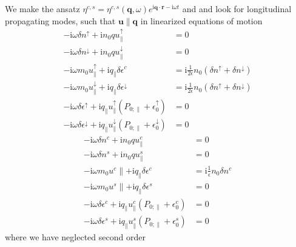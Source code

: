 \documentclass[aps,prb,reprint,twocolumns,superscriptaddress,nofootinbib]{revtex4-2}
\newcommand{\ii}{\mathrm{i}}
\begin{document}
We make the ansatz $ \eta^{c,s}=\eta^{c,s}(\bm q,\omega)e^{\ii\bm q\cdot \bm r-\ii\omega t}$ and and look for longitudinal propagating modes, such that $\bm u\parallel \bm q$ in linearized equations of motion
\begin{align}
	-\ii\omega \delta n^\uparrow + \ii n_0 q u_\parallel^\uparrow &=0 \\
	-\ii\omega \delta n^\downarrow + \ii n_0 q u_\parallel^\downarrow &=0 \\
	-\ii\omega m_0 u^\uparrow_\parallel + \ii q_\parallel \delta \epsilon^c &= \ii \frac{1}{2\epsilon} n_0(\delta n^\uparrow + \delta n^\downarrow) \\ 
	-\ii\omega m_0 u^\downarrow_\parallel + \ii q_\parallel \delta \epsilon^\downarrow &= \ii \frac{1}{2\epsilon} n_0(\delta n^\uparrow + \delta n^\downarrow) \\ 
	-\ii\omega \delta\epsilon^\uparrow + \ii q_\parallel u_\parallel^\uparrow\left(
	P_{0;\parallel} + \epsilon_0^\uparrow  \right) &=0 \\ 
	-\ii\omega \delta\epsilon^\downarrow + \ii q_\parallel u_\parallel^\downarrow\left(
	P_{0;\parallel} + \epsilon_0^\downarrow  \right) &=0
\end{align}
\begin{align}
	-\ii\omega \delta n^c + \ii n_0 q u_\parallel^c &=0 \\
	-\ii\omega \delta n^s + \ii n_0 q u_\parallel^s &=0 \\
	-\ii\omega m_0 u^c\parallel + \ii q_\parallel \delta \epsilon^c &= \ii \frac{1}{\epsilon} n_0\delta n^c \\ 
	-\ii\omega m_0 u^s\parallel + \ii q_\parallel \delta \epsilon^s &= 0 \\ 
	-\ii\omega \delta\epsilon^c + \ii q_\parallel u_\parallel^c\left(
	P_{0;\parallel} + \epsilon_0^c  \right) &=0 \\ 
	-\ii\omega \delta\epsilon^s + \ii q_\parallel u_\parallel^s\left(
	P_{0;\parallel} + \epsilon_0^s  \right) &=0
\end{align}
where we have neglected second order 
\end{document}

